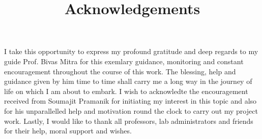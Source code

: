\thispagestyle{empty}
\title{Acknowledgements}
\date{}
\maketitle
I take this opportunity to express my profound gratitude and deep regards to my guide Prof. Bivas Mitra for this exemlary guidance, monitoring and constant encouragement throughout the course of this work. The blessing, help and guidance given by him time to time shall carry me a long way in the journey of life on which I am about to embark. I wish to acknowledte the encouragement received from Soumajit Pramanik for initiating my interest in this topic and also for his unparallelled help and motivation round the clock to carry out my project work. Lastly, I would like to thank all professors, lab administrators and friends for their help, moral support and wishes.
